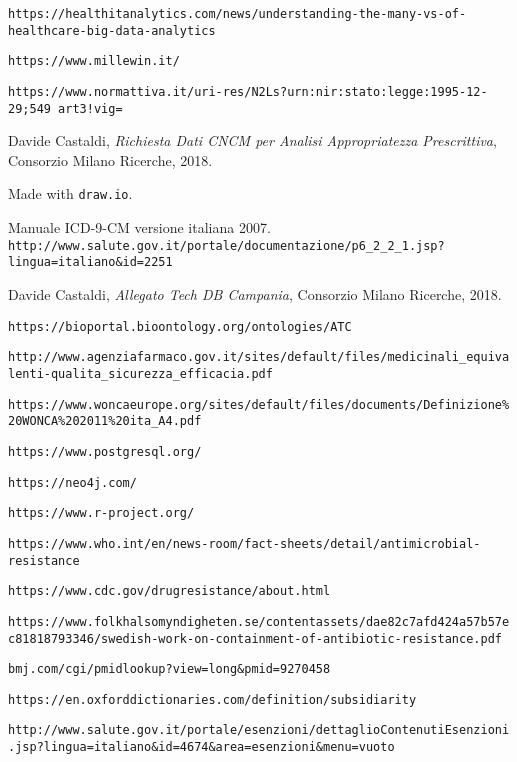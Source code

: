 \begin{thebibliography}{}
	\footnotesize
	
	\texttt{https://healthitanalytics.com/news/understanding-the-many-vs-of-healthcare-big-data-analytics}
	
	\texttt{https://www.millewin.it/}
	
	\texttt{https://www.normattiva.it/uri-res/N2Ls?urn:nir:stato:legge:1995-12-29;549~art3!vig=}
	
	Davide Castaldi, \textit{Richiesta Dati CNCM per Analisi Appropriatezza Prescrittiva}, Consorzio Milano Ricerche, 2018.
	
	Made with \texttt{draw.io}.
	
	Manuale ICD-9-CM versione italiana 2007. \\
	\texttt{http://www.salute.gov.it/portale/documentazione/p6\_2\_2\_1.jsp?lingua=italiano\&id=2251}
	
	Davide Castaldi, \textit{Allegato Tech DB Campania}, Consorzio Milano Ricerche, 2018.
	
	\texttt{https://bioportal.bioontology.org/ontologies/ATC} 
	
	\texttt{http://www.agenziafarmaco.gov.it/sites/default/files/medicinali\_equivalenti-qualita\_sicurezza\_efficacia.pdf}
	
	\texttt{https://www.woncaeurope.org/sites/default/files/documents/Definizione\%20WONCA\%202011\%20ita\_A4.pdf}
	
	\texttt{https://www.postgresql.org/}
	
	\texttt{https://neo4j.com/}
	
	\texttt{https://www.r-project.org/}
	
	\texttt{https://www.who.int/en/news-room/fact-sheets/detail/antimicrobial-resistance}
	
	\texttt{https://www.cdc.gov/drugresistance/about.html}
	
	\texttt{https://www.folkhalsomyndigheten.se/contentassets/dae82c7afd424a57b57ec81818793346/swedish-work-on-containment-of-antibiotic-resistance.pdf}
	
	\texttt{bmj.com/cgi/pmidlookup?view=long\&pmid=9270458}
	
	\texttt{https://en.oxforddictionaries.com/definition/subsidiarity}
	
	\texttt{http://www.salute.gov.it/portale/esenzioni/dettaglioContenutiEsenzioni.jsp?lingua=italiano\&id=4674\&area=esenzioni\&menu=vuoto}
	
\end{thebibliography}
	